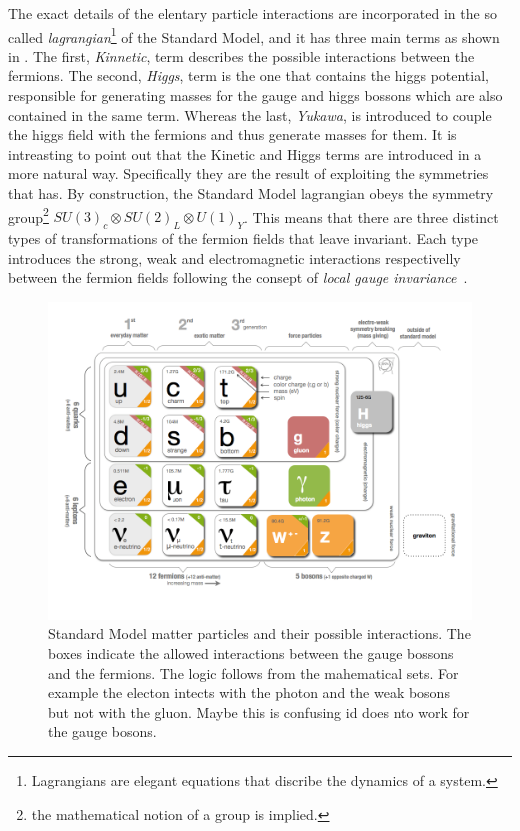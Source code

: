 The exact details of the elentary particle interactions are incorporated in the so called
{\it lagrangian}\footnote{ Lagrangians are elegant equations that discribe the dynamics of a system.} of the Standard Model,
 and it has three main terms as shown in . The first, {\it Kinnetic}, term describes the possible
interactions between the fermions. The second, {\it Higgs}, term is the one that contains the higgs potential, responsible for generating
masses for the gauge and higgs bossons which are also contained in the same term.
Whereas the last, {\it Yukawa}, is introduced to couple the higgs field with the fermions and thus generate masses for them.
It is intreasting to point out that the Kinetic and Higgs terms are introduced in a more natural way.
Specifically they are the result of exploiting the symmetries that  has.
By construction, the Standard Model lagrangian obeys the symmetry group\footnote{the mathematical notion of a group is implied.}
$SU(3)_c\otimes SU(2)_L\otimes U(1)_Y$. This means that there are three distinct types of transformations of the fermion fields that leave 
invariant. Each type introduces the strong, weak and electromagnetic interactions respectivelly between the
fermion fields following the consept of {\it local gauge invariance}~\cite{aitchison}.

\begin{figure}[h]
  \begin{center}
    \includegraphics[trim=1.4cm 0cm 5.95cm 0cm, clip=true, width=\textwidth]{Figures/Chapter1/Standard_model_infographic.png}
    \caption{Standard Model matter particles and their possible interactions. The boxes indicate the allowed interactions
             between the gauge bossons and the fermions. The logic follows from the mahematical sets. For example the electon
             intects with the photon and the weak bosons but not with the gluon. {\color{red} Maybe this is confusing id does nto work for the gauge bosons.}}
    \label{sm_particles}
  \end{center}
\end{figure}

